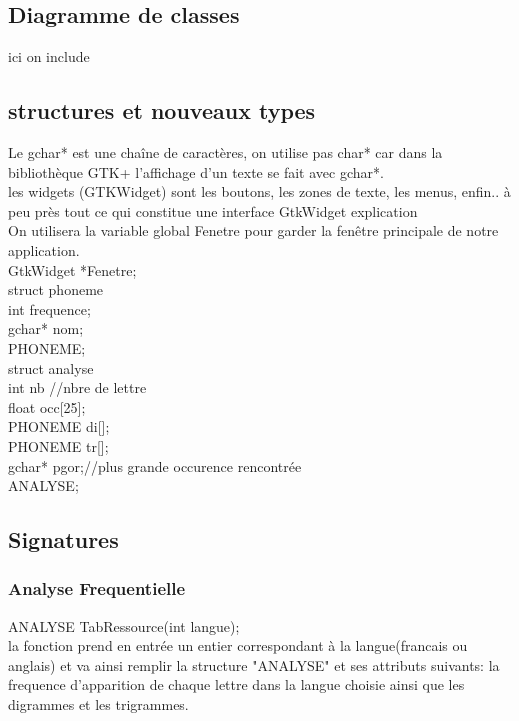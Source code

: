 \documentclass[a4]{article}
\begin{document}
		\subsection{Diagramme de classes}
		ici on include 
		\subsection{structures et nouveaux types}
		Le gchar* est une chaîne de caractères, on utilise pas char* car dans la bibliothèque
		GTK+ l'affichage d'un texte se fait avec gchar*.\\
		
		les widgets (GTKWidget) sont les boutons, les zones de texte, les menus, enfin.. à peu 
		près tout ce qui constitue une interface
		GtkWidget explication\\
		
		On utilisera la variable global Fenetre pour garder la fenêtre principale de notre application.\\
		GtkWidget *Fenetre; \\
		
	struct phoneme{\\
		int frequence;\\
		gchar* nom;\\
	}PHONEME;\\
	
	
	struct analyse{ \\
		int nb //nbre de lettre \\
		float occ[25];\\
		PHONEME di[];\\
		PHONEME tr[];\\
		gchar* pgor;//plus grande occurence rencontrée\\
	}ANALYSE;\\
	
		\subsection{Signatures}
		
	
	\subsubsection{Analyse Frequentielle}
	ANALYSE TabRessource(int langue);\\
		la fonction prend en entrée un entier correspondant à la langue(francais ou anglais)
		et va ainsi remplir la structure "ANALYSE" et ses attributs suivants:
		la frequence d'apparition de chaque lettre dans la langue choisie ainsi que les digrammes
		et les trigrammes.\\
		
\end{document}
